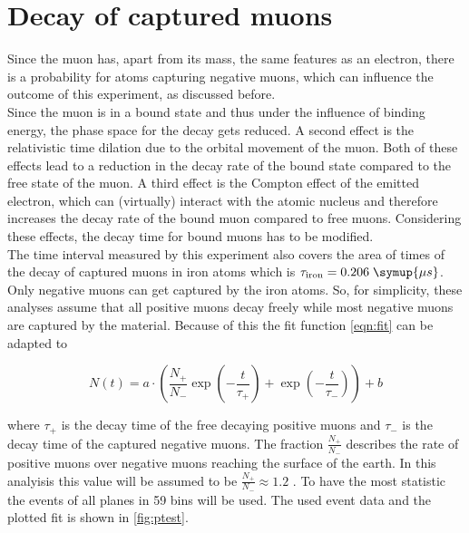 \section{Decay of captured muons}

\label{sec:muoncapture}

Since the muon has, apart from its mass, the same features as an electron, 
there is a probability for atoms capturing negative muons, which can influence
the outcome of this experiment, as discussed before. \\

Since the muon is in a bound state and thus under the influence of binding energy, 
the phase space for the decay gets reduced. A second effect is the relativistic time dilation due to the orbital movement of the muon. Both of these effects lead to a reduction in the decay rate of the bound state compared to the free state of the muon. A third effect is the Compton effect of the emitted electron, which can (virtually) interact with the atomic nucleus and therefore increases the decay rate of the bound muon compared to free muons. Considering these effects, the decay time for bound muons has to be modified\cite{bound}.\\

The time interval measured by this experiment also covers the area of times of the decay of captured muons in iron atoms which is $\tau_{\text{iron}} = 0.206 \; \symup{\mu s}$\cite{lvd}.
Only negative muons can get captured by the iron atoms. So, for simplicity, these analyses assume that all positive muons decay freely while most negative muons are captured by the material.
Because of this the fit function \ref{eqn:fit} can be adapted to 

\begin{equation*}
    N(t) = a \cdot \left( \frac{N_{+}}{N_{-}}\exp\left(- \frac{t}{\tau_{+}}\right) + \exp\left(- \frac{t}{\tau_{-}}\right) \right)  + b 
\end{equation*}

where $\tau_{+}$ is the decay time of the free decaying positive muons and $\tau_{-}$ is the decay time 
of the captured negative muons. The fraction $\frac{N_{+}}{N_{-}}$ describes the rate of 
positive muons over negative muons reaching the surface of the earth. In this analyisis this 
value will be assumed to be $\frac{N_{+}}{N_{-}} \approx 1.2$ \cite{lvd}. To have 
the most statistic the events of all planes in 59 bins will be used. The used event data and 
the plotted fit is shown in \autoref{fig:ptest}.

